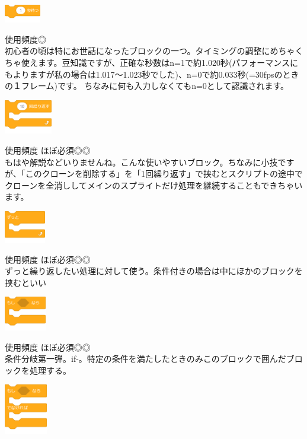 \documentclass[b5paper,10pt]{jsarticle}
\begin{document}
\begin{multicols*}{3}
\begin{itembox}{1}
\includegraphics[height=8mm]{images/control_1.png}
\end{itembox}
使用頻度◎\\
初心者の頃は特にお世話になったブロックの一つ。タイミングの調整にめちゃくちゃ使えます。豆知識ですが、正確な秒数はn=1で約1.020秒(パフォーマンスにもよりますが私の場合は1.017～1.023秒でした)、n=0で約0.033秒(=30fpsのときの１フレーム)です。
ちなみに何も入力しなくてもn=0として認識されます。
\begin{itembox}{2}
\includegraphics[height=15mm]{images/control_2.png}
\end{itembox}
使用頻度 ほぼ必須◎◎\\
もはや解説などいりませんね。こんな使いやすいブロック。ちなみに小技ですが、「このクローンを削除する」を「1回繰り返す」で挟むとスクリプトの途中でクローンを全消ししてメインのスプライトだけ処理を継続することもできちゃいます。
\begin{itembox}{3}
\includegraphics[height=14mm]{images/control_3.png}
\end{itembox}
使用頻度 ほぼ必須◎◎\\
ずっと繰り返したい処理に対して使う。条件付きの場合は中にほかのブロックを挟むといい
\begin{itembox}{4}
\includegraphics[height=15mm]{images/control_4.png}
\end{itembox}
使用頻度 ほぼ必須◎◎\\
条件分岐第一弾。if-。特定の条件を満たしたときのみこのブロックで囲んだブロックを処理する。
\begin{itembox}{5}
\includegraphics[height=22mm]{images/control_5.png}

\end{itembox}
\end{multicols*}
\end{document}
